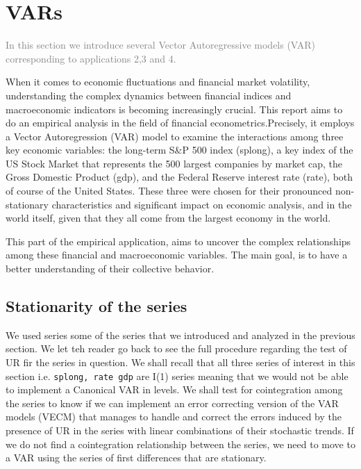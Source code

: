 \documentclass[hidelinks,12pts]{article}
\DeclareMathOperator{\1}{\mathbbm{1}}
\begin{document}
\newpage
\newpage
\section{VARs}

\textcolor{gray}{In this section we introduce several Vector Autoregressive models (VAR) corresponding to applications 2,3 and 4.}

When it comes to economic fluctuations and financial market volatility, understanding the complex dynamics between financial indices and macroeconomic indicators is becoming increasingly crucial. This report aims to do an empirical analysis in the field of financial econometrics.Precisely, it employs a Vector Autoregression (VAR) model to examine the interactions among three key economic variables: the long-term S\&P 500 index (splong), a key index of the US Stock Market that represents the 500 largest companies by market cap, the Gross Domestic Product (gdp), and the Federal Reserve interest rate (rate), both of course of the United States. These three were chosen for their pronounced non-stationary characteristics and significant impact on economic analysis, and in the world itself, given that they all come from the largest economy in the world.


This part of the empirical application, aims to uncover the complex relationships among these financial and macroeconomic variables. The main goal, is to have a better understanding of their collective behavior.


\subsection{Stationarity of the series}

We used series some of the series that  we introduced and analyzed in the previous section.
We let teh reader go back to see the full procedure regarding the test of UR fir the series in question. 
We shall recall that all three series of interest in this section i.e. \texttt{splong, rate  gdp} are I(1) series meaning that we would not be able to implement a Canonical VAR in levels. 
We shall test for cointegration among the series to know if we can implement an error correcting version of the VAR models (VECM) that manages to handle and correct the errors induced by the presence of UR in the series with linear combinations of their stochastic trends. 
If we do not find a cointegration relationship between the series, we need to move to a VAR using the series of first differences that are stationary. 
\end{document}
